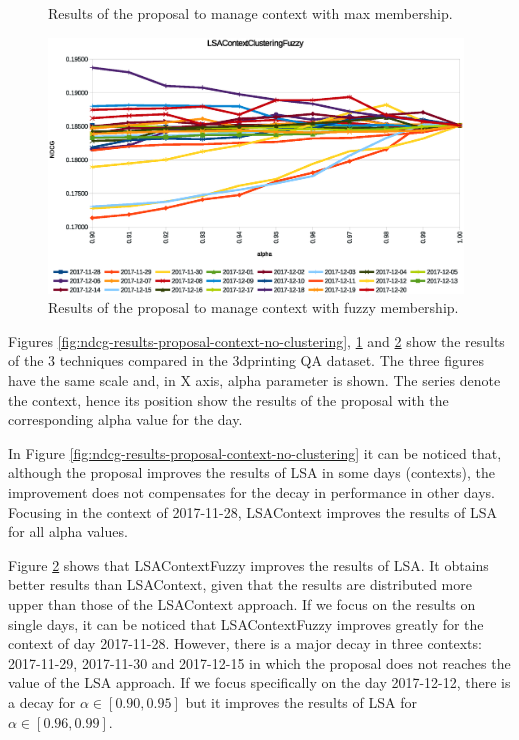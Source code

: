 \documentclass[preprint]{elsarticle}
\begin{document}
\begin{spacing}{1.5}
\begin{figure}[htb]
    \caption{Results of the proposal to manage context with max membership.}
    \label{fig:ndcg-results-proposal-context-fuzzy-clustering-max}
\end{figure}
\begin{figure}[htb]
    \centering
    \includegraphics[width=0.98\textwidth]{figures/ndcg-results-proposal-context-fuzzy-clustering-membership.eps}
    \caption{Results of the proposal to manage context with fuzzy membership.}
    \label{fig:ndcg-results-proposal-context-fuzzy-clustering-membership}
\end{figure}

Figures \ref{fig:ndcg-results-proposal-context-no-clustering}, \ref{fig:ndcg-results-proposal-context-fuzzy-clustering-max} and \ref{fig:ndcg-results-proposal-context-fuzzy-clustering-membership} show the results of the 3 techniques compared in the 3dprinting QA dataset. The three figures have the same scale and, in X axis, alpha parameter is shown. The series denote the context, hence its position show the results of the proposal with the corresponding alpha value for the day.

In Figure \ref{fig:ndcg-results-proposal-context-no-clustering} it can be noticed that, although the proposal improves the results of LSA in some days (contexts), the improvement does not compensates for the decay in performance in other days. Focusing in the context of 2017-11-28, LSAContext improves the results of LSA for all alpha values.

Figure \ref{fig:ndcg-results-proposal-context-fuzzy-clustering-membership} shows that LSAContextFuzzy improves the results of LSA. It obtains better results than LSAContext, given that the results are distributed more upper than those of the LSAContext approach. If we focus on the results on single days, it can be noticed that LSAContextFuzzy improves greatly for the context of day 2017-11-28. However, there is a major decay in three contexts: 2017-11-29, 2017-11-30 and 2017-12-15 in which the proposal does not reaches the value of the LSA approach. If we focus specifically on the day 2017-12-12, there is a decay for $\alpha \in [0.90,0.95]$ but it improves the results of LSA for $\alpha \in [0.96,0.99]$.


\end{spacing}
\end{document}
